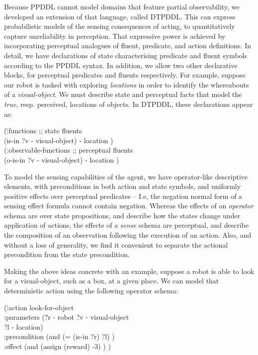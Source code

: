 \documentclass[letterpaper]{article}
\begin{document}
Because PPDDL cannot model domains that feature partial observability,
we developed an extension of that language, called DTPDDL. This can
express probabilistic models of the sensing consequences of acting, to
quantitatively capture unreliability in perception. That expressive
power is achieved by incorporating perceptual analogues of fluent,
predicate, and action definitions. In detail, we have declarations of
state characterising predicate and fluent symbols according to the
PPDDL syntax. In addition, we allow two other declarative blocks, for
perceptual predicates and fluents respectively. For example, suppose
our robot is tasked with exploring {\em locations} in order to
identify the whereabouts of a {\em visual-object}. We must describe
state and perceptual facts that model the {\em true}, resp. perceived,
locations of objects. In DTPDDL, these declarations appear as:

\small
\begin{tabtt}
(\=:functions  ;; state fluents\\
  \> (is-in ?v - visual-object) - location )\\
(:observable-functions  ;; perceptual fluents\\
  \> (o-is-in ?v - visual-object) - location )
\end{tabtt}
\normalsize

\noindent To model the sensing capabilities of the agent, we have
operator-like descriptive elements, with preconditions in both action
and state symbols, and uniformly positive effects over perceptual
predicates -- I.e, the negation normal form of a sensing effect
formula cannot contain negation. Whereas the effects of an {\em
operator} schema are over state propositions, and describe how the
states change under application of actions, the effects of a {\em
sense} schema are perceptual, and describe the composition of an
observation following the execution of an action. Also, and without a
loss of generality, we find it convenient to separate the actional
precondition from the state precondition. 

Making the above ideas concrete with an example, suppose a robot is
able to look for a visual-object, such as a box, at a given place. We
can model that deterministic action using the following operator
schema:


\small
\begin{tabtt}
(\=:action look-for-object \+ \\
   :parameters (\=?r - robot ?v - visual-object\\
   \> ?l - location) \\
   :precondition (and (= (is-in ?r) ?l) ) \\
   :effect (and (assign (reward) -3) ) ) \\
\end{tabtt}
\normalsize
\end{document}
